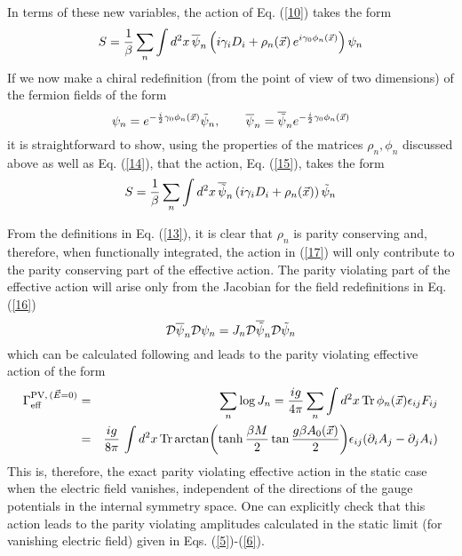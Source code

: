 \documentclass[a4paper,12pt]{article}
\begin{document}
In terms of these new variables, the action of
Eq. (\ref{10}) takes the form
\begin{equation}
 S = {1\over \beta} \sum_{n} \int d^{2}x\, \overline{\psi}_{n}
\left(i\gamma_{i}D_{i} +
  \rho_{n}(\vec{x})\,e^{i\gamma_{0}\phi_{n}(\vec{x})}\right)\psi_{n}\label{15}
\end{equation}
If we now make a chiral redefinition (from the point of view of two dimensions)
 of the fermion fields of the form
\begin{equation}
\psi_{n} = e^{-{i\over 2}\gamma_{0}\phi_{n}(\vec{x})}
\tilde{\psi}_{n},\qquad \overline{\psi}_{n} =
\overline{\tilde{\psi}}_{n} e^{-{i\over
    2}\gamma_{0}\phi_{n}(\vec{x})}\label{16}
\end{equation}
it is straightforward to show, using the properties of the matrices
$\rho_{n},\phi_{n}$ discussed above as well as Eq. (\ref{14}), that
the action, Eq. (\ref{15}), takes the form
\begin{equation}
 S = {1\over \beta} \sum_{n} \int d^{2}x\,
\overline{\tilde{\psi}}_{n}\left(i\gamma_{i}D_{i} +
  \rho_{n}(\vec{x})\right)\tilde{\psi}_{n}\label{17}
\end{equation}

From the definitions in Eq. (\ref{13}), it is clear that $\rho_{n}$ is
parity conserving and, therefore, when functionally integrated, the
action in (\ref{17}) will only contribute to the parity conserving part
of the effective action. The parity violating part of the effective
action will arise only from the Jacobian for the field redefinitions
in Eq. (\ref{16})
\[
{\cal D}\overline{\psi}_{n} {\cal D}\psi_{n} = J_{n} {\cal
  D}\overline{\tilde{\psi}}_{n} {\cal D}\tilde{\psi}_{n}
\]
which can be calculated following \cite{fosco:1997vu,gamboa:1981} 
and leads to the parity violating effective action of the form
\begin{eqnarray}
\Gamma_{\rm eff}^{{\rm PV},\,(\vec{E}=0)} & = & \sum_{n} \log
  J_{n} = {ig\over 4\pi} \sum_{n} \int d^{2}x\,{\rm
  Tr}\,\phi_{n}(\vec{x})\epsilon_{ij} F_{ij}\\\label{18}
 & = & {ig\over 8\pi}\,\int d^{2}x\,{\rm Tr}\arctan\!\left(\tanh
  {\beta M\over 2} \tan {g\beta A_{0}(\vec{x})\over
  2}\right)\!\epsilon_{ij}(\partial_{i}A_{j} - \partial_{j}A_{i})\nonumber
\end{eqnarray}
This is, therefore, the exact parity violating effective action in the
static case when the electric field vanishes, independent of the
directions of the gauge potentials in the internal symmetry space. One
can  explicitly check
that this action leads to the parity violating amplitudes calculated
in the static limit (for vanishing electric field) given in
Eqs. (\ref{5})-(\ref{6}). 
\end{document}
